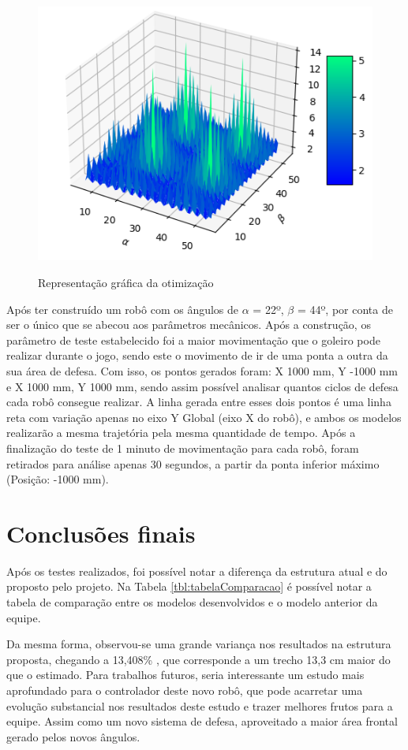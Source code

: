 \documentclass[a4paper,10pt,twocolumn,fleqn]{article}
\begin{document}
    \begin{figure}[!htp]
        \centering
        \caption{Representação gráfica da otimização}
        \includegraphics[width=0.8\linewidth]{Figure_0_1_Vx.png}
        \label{fig:angulo0.1}
    \end{figure}

    Após ter construído um robô com os ângulos de $\alpha$ = 22º, $\beta$ = 44º, por conta de ser o único que se abecou aos parâmetros mecânicos. Após a construção, os parâmetro de teste estabelecido foi a maior movimentação que o goleiro pode realizar durante o jogo, sendo este o movimento de ir de uma ponta a outra da sua área de defesa. Com isso, os pontos gerados foram: X 1000 mm, Y -1000 mm e X 1000 mm, Y 1000 mm, sendo assim possível analisar quantos ciclos de defesa cada robô consegue realizar. A linha gerada entre esses dois pontos é uma linha reta com variação apenas no eixo Y Global (eixo X do robô), e ambos os modelos realizarão a mesma trajetória pela mesma quantidade de tempo. Após a finalização do teste de 1 minuto de movimentação para cada robô, foram retirados para análise apenas 30 segundos, a partir da ponta inferior máximo (Posição: -1000 mm).
    
    \section{Conclusões finais}
    
    Após os testes realizados, foi possível notar a diferença da estrutura atual e do proposto pelo projeto. Na Tabela \ref{tbl:tabelaComparacao} é possível notar a tabela de comparação entre os modelos desenvolvidos e o modelo anterior da equipe.
    
    Da mesma forma, observou-se uma grande variança nos resultados na estrutura proposta, chegando a 13,408\% , que corresponde a um trecho 13,3 cm maior do que o estimado. Para trabalhos futuros, seria interessante um estudo mais aprofundado para o controlador deste novo robô, que pode acarretar uma evolução substancial nos resultados deste estudo e trazer melhores frutos para a equipe. Assim como um novo sistema de defesa, aproveitado a maior área frontal gerado pelos novos ângulos.  
    
\end{document}
